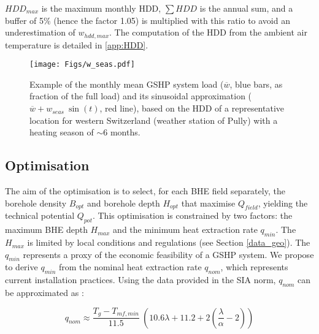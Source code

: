 $HDD_{max}$ is the maximum monthly HDD, $\sum HDD$ is the annual sum, and a buffer of 5\% (hence the factor 1.05) is multiplied with this ratio to avoid an underestimation of $w_{hdd,max}$.
The computation of the HDD from the ambient air temperature is detailed in \ref{app:HDD}.

\begin{figure}[tb]
\centering
\texttt{[image: Figs/w\_seas.pdf]} 
\caption{Example of the monthly mean GSHP system load ($\overline{w}$, blue bars, as fraction of the full load) and its sinusoidal approximation ($\overline{w} + w_{seas} \ \sin(t)$, red line), based on the HDD of a representative location for western Switzerland (weather station of Pully) with a heating season of $\sim 6$ months.}
\label{fig:w_seas}
\end{figure}

\begin{comment} 
\begin{equation}
\label{eq:q}
    \overline{q} = q_{max} \times \frac{t_{op}}{365\times24}, \quad q_{seas} = q_{max} \times w_{hdd} \times \frac{t_{op}}{31\times24} - \overline{q}  %
\end{equation}
\end{comment} 

\subsection{Optimisation}
\label{optimisation}

The aim of the optimisation is to select, for each BHE field separately, the borehole density $B_{opt}$ and borehole depth $H_{opt}$ that maximise $Q_{field}$, yielding the technical potential $Q_{pot}$.
This optimisation is constrained by two factors: the maximum BHE depth $H_{max}$ and the minimum heat extraction rate $q_{min}$.
The $H_{max}$ is limited by local conditions and regulations (see Section \ref{data_geo}).
The $q_{min}$ represents a proxy of the economic feasibility of a GSHP system. 
We propose to derive $q_{min}$ from the nominal heat extraction rate $q_{nom}$, which represents current installation practices. 
Using the data provided in the SIA norm, $q_{nom}$ can be approximated as \cite{sia_sondes_2010}:

\begin{equation}
\label{eq:q_nom}
    q_{nom} \approx \frac{T_g - T_{mf, min}}{11.5} \ \left( 10.6 \lambda + 11.2 + 2 \left( \frac{\lambda}{\alpha} - 2 \right) \right)
\end{equation}

